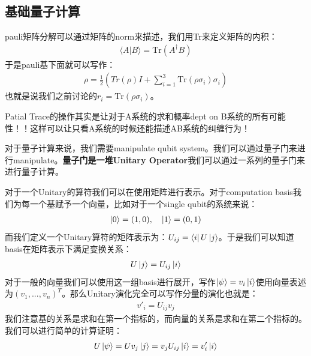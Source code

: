 
\subsection{基础量子计算}

pauli矩阵分解可以通过矩阵的norm来描述，我们用Tr来定义矩阵的内积：
\begin{align}
  \langle A|B \rangle =\mathrm{Tr}(A^{\dagger}B)
\end{align}
于是pauli基下面就可以写作：
\begin{align}
  \rho = \displaystyle\frac{1}{2} (Tr(\rho)I + \sum_{i=1}^3
  \mathrm{Tr}(\rho \sigma_i)\sigma_i)
\end{align}
也就是说我们之前讨论的$ r_i = \mathrm{Tr}(\rho \sigma_i) $。

\bigskip
{}

Patial Trace的操作其实是让对于A系统的求和概率dept
on B系统的所有可能性！！这样可以让只看A系统的时候还能描述AB系统的纠缠行为！

\bigskip
{}

对于量子计算来说，我们需要manipulate qubit
system。我们可以通过量子门来进行manipulate。\textbf{量子门是一堆Unitary
Operator}我们可以通过一系列的量子门来进行量子计算。

\bigskip
{}

对于一个Unitary的算符我们可以在使用矩阵进行表示。对于computation
basis我们为每一个基赋予一个向量，比如对于一个single qubit的系统来说：
\begin{align}
  \left| 0 \right\rangle = (1,0) ,\quad \left| 1 \right\rangle = (0,1)
\end{align}
而我们定义一个Unitary算符的矩阵表示为：$ U_{ij} = \left\langle i \right| U \left| j \right\rangle $。于是我们可以知道basis在矩阵表示下满足变换关系：
\begin{align}
  U\left| j \right\rangle = U_{ij} \left| i \right\rangle
\end{align}
对于一般的向量我们可以使用这一组basis进行展开，写作$ \left| \psi \right\rangle = v_i \left| i \right\rangle $使用向量表述为$
(v_1, ... , v_n)^T $。那么Unitary演化完全可以写作分量的演化也就是：
\begin{align}
  v'_i = U_{ij} v_j
\end{align}
我们注意基的关系是求和在第一个指标的，而向量的关系是求和在第二个指标的。我们可以进行简单的计算证明：
\begin{align}
  U \left| \psi \right\rangle = U v_j \left| j \right\rangle = v_j U_{ij} \left| i \right\rangle = v'_i \left| i \right\rangle
\end{align}

\bigskip
{}

